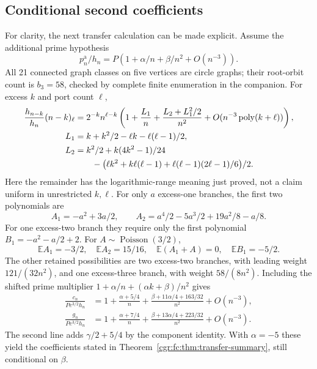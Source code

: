 \documentclass[11pt,letterpaper]{article}
\numberwithin{equation}{section}
\theoremstyle{definition}\newtheorem{definition}[theorem]{Definition}
\theoremstyle{remark}\newtheorem{remark}[theorem]{Remark}
\newcommand{\EE}{\mathbb E}
\DeclareMathOperator{\Poi}{Poisson}
\begin{document}
\subsection{Conditional second coefficients}\label{cgr:fc:sub:second}
For clarity, the next transfer calculation can be made explicit.
Assume the additional prime hypothesis
\[
 p_n^{\mathrm a}/h_n=P(1+\alpha/n+\beta/n^2+O(n^{-3})).
\]
All 21 connected graph classes on five vertices are circle graphs;
their root-orbit count is $b_3=58$, checked by complete finite
enumeration in the companion. For excess $k$ and port count $\ell$,
\begin{align*}
 \frac{h_{n-k}}{h_n}(n-k)_\ell
 &=2^{-k}n^{\ell-k}
 \left(1+\frac{L_1}{n}+\frac{L_2+L_1^2/2}{n^2}
            +O(n^{-3}\operatorname{poly}(k+\ell))\right),\\
 L_1&=k+k^2/2-\ell k-\ell(\ell-1)/2,\\
 L_2&=k^2/2+k(4k^2-1)/24\\
 &\hspace{7mm}-\bigl(\ell k^2+k\ell(\ell-1)
            +\ell(\ell-1)(2\ell-1)/6\bigr)/2.
\end{align*}
Here the remainder has the logarithmic-range meaning just proved,
not a claim uniform in unrestricted $k,\ell$.
For only $a$ excess-one branches, the first two polynomials are
\[
 A_1=-a^2+3a/2,\qquad
 A_2=a^4/2-5a^3/2+19a^2/8-a/8.
\]
For one excess-two branch they require only the first polynomial
$B_1=-a^2-a/2+2$.
For $A\sim\Poi(3/2)$,
\[
 \EE A_1=-3/2,\quad \EE A_2=15/16,\quad
 \EE(A_1+A)=0,\quad \EE B_1=-5/2.
\]
The other retained possibilities are two excess-two branches,
with leading weight $121/(32n^2)$, and one excess-three branch,
with weight $58/(8n^2)$. Including the shifted prime multiplier
$1+\alpha/n+(\alpha k+\beta)/n^2$ gives
\begin{align}
 \frac{c_n}{P e^{3/2}h_n}
 &=1+\frac{\alpha+5/4}{n}
   +\frac{\beta+11\alpha/4+163/32}{n^2}+O(n^{-3}),
 \label{cgr:fc:eq:secondc}\\
 \frac{g_n}{P e^{3/2}h_n}
 &=1+\frac{\alpha+7/4}{n}
   +\frac{\beta+13\alpha/4+223/32}{n^2}+O(n^{-3}).
 \label{cgr:fc:eq:secondg}
\end{align}
The second line adds $\gamma/2+5/4$ by the component identity.
With $\alpha=-5$ these yield the coefficients stated in
Theorem~\ref{cgr:fc:thm:transfer-summary}, still conditional on $\beta$.
\end{document}
